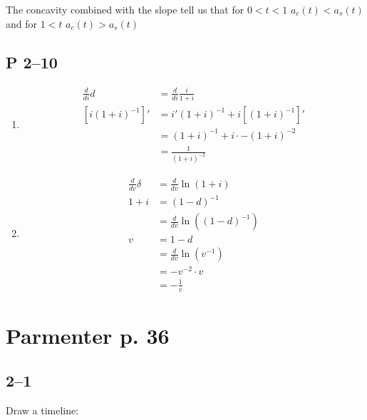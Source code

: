 \documentclass[a4paper, 12pt, reqno]{amsart}
\numberwithin{equation}{section}
\begin{document}
The concavity combined with the slope tell us that for $0<t<1$ $a_c(t)
< a_s(t)$ and for $1 < t$  $a_c(t) > a_s(t)$

\subsection*{P 2--10}

\begin{enumerate}[label=(\alph*)]
    \item \begin{equation}\nonumber
        \begin{aligned}
            \frac{d}{di} d &= \frac{d}{di} \frac{i}{1+i}    \\
            \left[i(1+i)^{-1}\right]' &= i'(1+i)^{-1} + i\left[(1+i)^{-1}\right]'\\
            &= (1+i)^{-1} + i \cdot -(1+i)^{-2} \\
            &= \frac{1}{(1+i)^{-2}}
        \end{aligned}
    \end{equation}
    \item \begin{equation}\nonumber
        \begin{aligned}
            \frac{d}{dv} \delta &= \frac{d}{dv} \ln(1+i) \\
            1+i &= (1-d)^{-1}                   \\
            &= \frac{d}{dv} \ln\left((1-d)^{-1}\right)  \\
            v &= 1-d                \\
            &= \frac{d}{dv} \ln\left(v^{-1}\right)  \\
            &= -v^{-2} \cdot v  \\
            &= -\frac{1}{v}
        \end{aligned}
    \end{equation}
\end{enumerate}

\newpage
\section{Parmenter p. 36}

\subsection*{2--1}

Draw a timeline:\\
\end{document}
